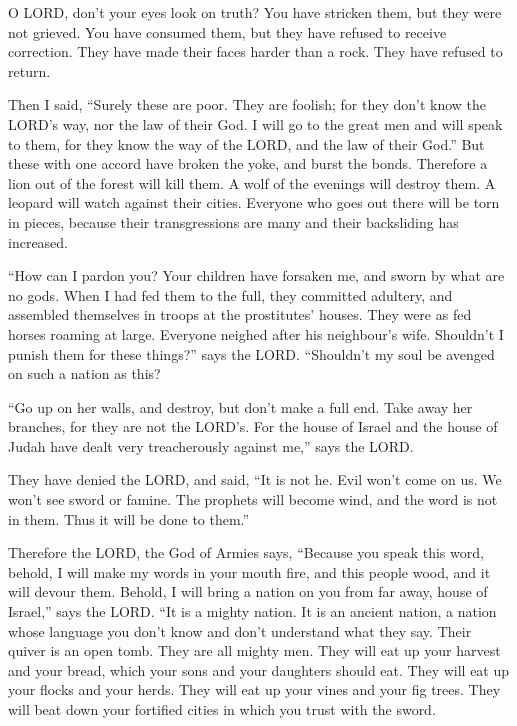  O LORD, don't your eyes look on truth? You have stricken
them, but they were not grieved. You have consumed them, but they have
refused to receive correction. They have made their faces harder than a
rock. They have refused to return.

 Then I said, ``Surely these are poor. They are foolish; for
they don't know the LORD's way, nor the law of their God.  I
will go to the great men and will speak to them, for they know the way
of the LORD, and the law of their God.'' But these with one accord have
broken the yoke, and burst the bonds.  Therefore a lion out
of the forest will kill them. A wolf of the evenings will destroy them.
A leopard will watch against their cities. Everyone who goes out there
will be torn in pieces, because their transgressions are many and their
backsliding has increased.

 ``How can I pardon you? Your children have forsaken me, and
sworn by what are no gods. When I had fed them to the full, they
committed adultery, and assembled themselves in troops at the
prostitutes' houses.  They were as fed horses roaming at
large. Everyone neighed after his neighbour's wife. 
Shouldn't I punish them for these things?'' says the LORD. ``Shouldn't
my soul be avenged on such a nation as this?

 ``Go up on her walls, and destroy, but don't make a full
end. Take away her branches, for they are not the LORD's. 
For the house of Israel and the house of Judah have dealt very
treacherously against me,'' says the LORD.

 They have denied the LORD, and said, ``It is not he. Evil
won't come on us. We won't see sword or famine.  The
prophets will become wind, and the word is not in them. Thus it will be
done to them.''

 Therefore the LORD, the God of Armies says, ``Because you
speak this word, behold, I will make my words in your mouth fire, and
this people wood, and it will devour them.  Behold, I will
bring a nation on you from far away, house of Israel,'' says the LORD.
``It is a mighty nation. It is an ancient nation, a nation whose
language you don't know and don't understand what they say.
 Their quiver is an open tomb. They are all mighty men.
 They will eat up your harvest and your bread, which your
sons and your daughters should eat. They will eat up your flocks and
your herds. They will eat up your vines and your fig trees. They will
beat down your fortified cities in which you trust with the sword.

